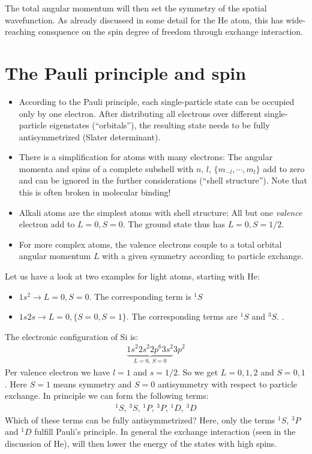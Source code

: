 \documentclass[10pt]{article}
\newcommand*\ch[1]{\ensuremath{\mathrm{#1}}}
\begin{document}
The total angular momentum will then set the symmetry of the spatial wavefunction. As already discussed in some detail for the He atom, this has wide-reaching consquence on the spin degree of freedom through exchange interaction. 

\section{The Pauli principle and spin}
\begin{itemize}
\item According to the Pauli principle, each single-particle state can be occupied only by one electron. After distributing all electrons over different single-particle eigenstates (``orbitals''), the resulting state needs to be fully antisymmetrized (Slater determinant).
\item There is a simplification for atoms with many electrons: The angular momenta and spins of a complete subshell  with $n,\,l,\,\{m_{-l},\cdots,m_l\}$ add to zero and can be ignored in the further considerations (``shell structure''). Note that this is often broken in molecular binding!
\item Alkali atoms are the simplest atoms with shell structure: All but one \emph{valence} electron add to $L=0,S=0$. The ground state thus has $L=0,S=1/2$.
\item For more complex atoms, the valence electrons couple to a total orbital angular momentum $L$ with a given symmetry according to particle exchange.
\end{itemize}

Let us have a look at two examples for light atoms, starting with \ch{He}:
\begin{itemize}
\item $1s^2 \rightarrow L=0,S=0$. The corresponding term is $^1S$
\item $1s2s \rightarrow L=0, \{S=0,S=1\}$. The corresponding terms are $^1S$ and $^3S$. .
\end{itemize}

The electronic configuration of \ch{Si} is:
\begin{align}
\underbrace{1s^2 2s^2 2p^6 3s^2}_{L=0,\,S=0} 3p^2
\end{align}
 Per valence electron we have $l=1$ and $s=1/2$. So we get $L=0,1,2$ and $S=0,1$. Here $S=1$ means symmetry and $S=0$ antisymmetry with respect to particle exchange.
 In principle we can form the following terms:
\begin{align}
^1S,\,^3S,\,^1P,\,^3P,\,^1D,\,^3D
\end{align}
Which of these terms can be fully antisymmetrized? Here, only the terms $^1S$, $^3P$ and $^1D$ fulfill Pauli's principle. In general the exchange interaction (seen in the discussion of He), will then lower the energy of the states with high spins.
\end{document}
